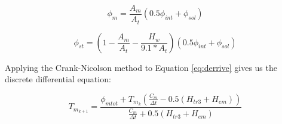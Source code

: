 \begin{equation} 
\label{eq:phi_m2}
      \phi_{m}= \frac{A_m}{A_t}(0.5\phi_{int} + \phi_{sol})
\end{equation}

\begin{equation} 
\label{eq:phi_st2}
      \phi_{st}= (1-\frac{A_m}{A_t}-\frac{H_w}{9.1*A_t})(0.5\phi_{int}+\phi_{sol})
\end{equation}




Applying the Crank-Nicolson method \cite{crank1947practical} to Equation \ref{eq:derrive} gives us the discrete differential equation: 

\begin{equation} 
\label{eq:derivation2}
      T_{m_{k+1}}={\frac{\phi_{mtot}+T_{m_k}(\frac{C_m}{\Delta t} - 0.5(H_{tr3}+H_{em}))}{\frac{C_m}{\Delta t} + 0.5(H_{tr3}+H_{em})}}
\end{equation}